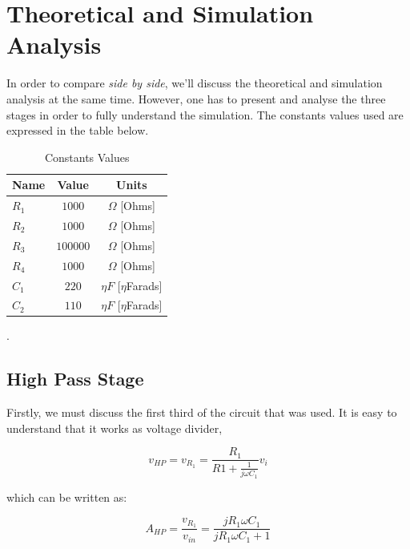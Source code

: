 \section{Theoretical and Simulation Analysis}
\label{sec:analysis}

In order to compare \textit{side by side}, we'll discuss the theoretical and simulation analysis at the same time. However, one has to present and analyse the three stages in order to fully understand the simulation. The constants values used are expressed in the table below.

\begin{table}[h]
    \centering
    \begin{tabular}{|l|c|c|}
    \hline
    {\bf Name} & {\bf Value} & {\bf Units} \\ \hline
    $R_1$ & $1000$ & $\Omega$ [Ohms] \\ \hline
    $R_2$ & $1000$ & $\Omega$ [Ohms] \\ \hline
    $R_3$ & $100000$ & $\Omega$ [Ohms] \\ \hline
    $R_4$ & $1000$ & $\Omega$ [Ohms] \\ \hline
    $C_1$ & $220$ & $\eta F$ [$\eta$Farads]\\ \hline
    $C_2$ & $110$ & $\eta F$ [$\eta$Farads] \\ \hline
    \end{tabular}
    \caption[Constants Values]{Constants Values \footnotemark}
    \label{tab:constants}
\end{table}

.

\subsection{High Pass Stage}
\label{subsec:stat}

Firstly, we must discuss the first third of the circuit that was used. 
It is easy to understand that it works as voltage divider,

\begin{equation}
    v_{HP}=v_{R_1}=\frac{R_1}{R1+\frac{1}{j\omega C_1}}v_i
\end{equation}

which can be written as:

\begin{equation}
    A_{HP}=\frac{v_{R_1}}{v_{in}}=\frac{j R_1 \omega C_1}{j R_1 \omega C_1 + 1}
\end{equation}

